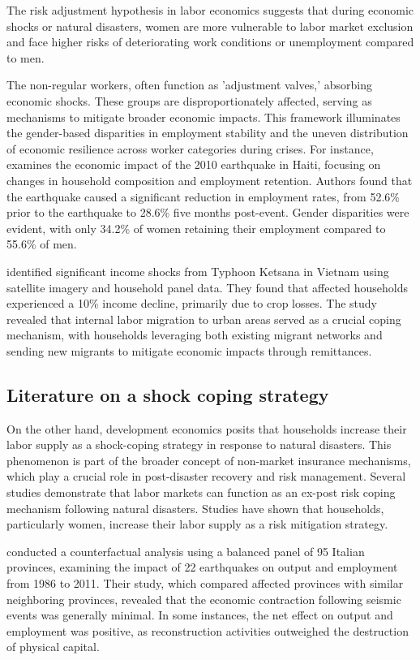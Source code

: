 \documentclass[12pt,halfline,a4paper]{ouparticle}
\begin{document}
The risk adjustment hypothesis in labor economics suggests that during economic shocks or natural disasters, women are more vulnerable to labor market exclusion and face higher risks of deteriorating work conditions or unemployment compared to men. 


The non-regular workers, often function as 'adjustment valves,' absorbing economic shocks. These groups are disproportionately affected, serving as mechanisms to mitigate broader economic impacts. This framework illuminates the gender-based disparities in employment stability and the uneven distribution of economic resilience across worker categories during crises. For instance, \citet{Kim2014ARetention} examines the economic impact of the 2010 earthquake in Haiti, focusing on changes in household composition and employment retention. Authors found that the earthquake caused a significant reduction in employment rates, from 52.6\% prior to the earthquake to 28.6\% five months post-event. Gender disparities were evident, with only 34.2\% of women retaining their employment compared to 55.6\% of men. 



\citet{Groger2016InternalTyphoon} identified significant income shocks from Typhoon Ketsana in Vietnam using satellite imagery and household panel data. They found that affected households experienced a 10\% income decline, primarily due to crop losses. The study revealed that internal labor migration to urban areas served as a crucial coping mechanism, with households leveraging both existing migrant networks and sending new migrants to mitigate economic impacts through remittances.

\subsection{Literature on a shock coping strategy}
\label{sec5.1}

On the other hand, development economics posits that households increase their labor supply as a shock-coping strategy in response to natural disasters. This phenomenon is part of the broader concept of non-market insurance mechanisms, which play a crucial role in post-disaster recovery and risk management. Several studies demonstrate that labor markets can function as an ex-post risk coping mechanism following natural disasters. Studies have shown that households, particularly women, increase their labor supply as a risk mitigation strategy. 

 \citet{Porcelli2019TheItaly} conducted a counterfactual analysis using a balanced panel of 95 Italian provinces, examining the impact of 22 earthquakes on output and employment from 1986 to 2011. Their study, which compared affected provinces with similar neighboring provinces, revealed that the economic contraction following seismic events was generally minimal. In some instances, the net effect on output and employment was positive, as reconstruction activities outweighed the destruction of physical capital.
\end{document}
